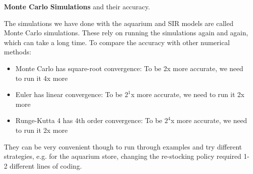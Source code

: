 \begin{slide}
\question

\textbf{Monte Carlo Simulations} and their accuracy.

The simulations we have done with the aquarium and SIR models are called Monte Carlo simulations. These rely on running the simulations again and again, which can take a long time. To compare the accuracy with other numerical methods:

\begin{itemize}
	\item Monte Carlo has square-root convergence: To be 2x more accurate, we need to run it 4x more
	\item Euler has linear convergence: To be $2^1$x more accurate, we need to run it 2x more
	\item Runge-Kutta 4 has 4th order convergence: To be $2^4$x more accurate, we need to run it 2x more
\end{itemize}

They can be very convenient though to run through examples and try different strategies, e.g. for the aquarium store, changing the re-stocking policy required 1-2 different lines of coding.

\end{slide}



